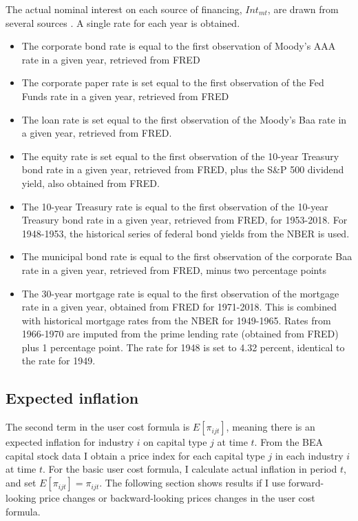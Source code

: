 \documentclass[11pt]{article}
\begin{document}
The actual nominal interest on each source of financing, $Int_{mt}$, are drawn from several sources \citep{fedint,fredmort,moodys,nberhistory}. A single rate for each year is obtained.

\begin{itemize}
	\item The corporate bond rate is equal to the first observation of Moody's AAA rate in a given year, retrieved from FRED
	\item The corporate paper rate is set equal to the first observation of the Fed Funds rate in a given year, retrieved from FRED
	\item The loan rate is set equal to the first observation of the Moody's Baa rate in a given year, retrieved from FRED.
	\item The equity rate is set equal to the first observation of the 10-year Treasury bond rate in a given year, retrieved from FRED, plus the S\&P 500 dividend yield, also obtained from FRED.
	\item The 10-year Treasury rate is equal to the first observation of the 10-year Treasury bond rate in a given year, retrieved from FRED, for 1953-2018. For 1948-1953, the historical series of federal bond yields from the NBER is used. 
	\item The municipal bond rate is equal to the first observation of the corporate Baa rate in a given year, retrieved from FRED, minus two percentage points
	\item The 30-year mortgage rate is equal to the first observation of the mortgage rate in a given year, obtained from FRED for 1971-2018. This is combined with historical mortgage rates from the NBER for 1949-1965. Rates from 1966-1970 are imputed from the prime lending rate (obtained from FRED) plus 1 percentage point. The rate for 1948 is set to 4.32 percent, identical to the rate for 1949.
\end{itemize}

\subsection{Expected inflation}
The second term in the user cost formula is $E[\pi_{ijt}]$, meaning there is an expected inflation for industry $i$ on capital type $j$ at time $t$. From the BEA capital stock data \citep{beacap} I obtain a price index for each capital type $j$ in each industry $i$ at time $t$. For the basic user cost formula, I calculate actual inflation in period $t$, and set $E[\pi_{ijt}] = \pi_{ijt}$. The following section shows results if I use forward-looking price changes or backward-looking prices changes in the user cost formula.
\end{document}
